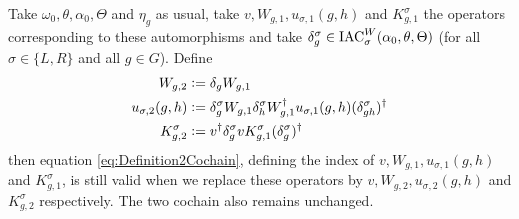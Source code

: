 \documentclass[12pt,a4paper,twoside]{article}
\numberwithin{equation}{section}
\begin{document}
\begin{lemma}\label{lem:TransformationUnderDeltaAppendix}
	Take $\omega_0,\theta,\alpha_0,\Theta$ and $\eta_g$ as usual, take $v,W_{g,1},u_{\sigma,1}(g,h)$ and $K_{g,1}^\sigma$ the operators corresponding to these automorphisms and take $\delta^\sigma_g\in\textrm{IAC}_\sigma^W(\alpha_0,\theta,\Theta)$ (for all $\sigma\in\{L,R\}$ and all $g\in G$). Define
	\begin{align}
		W_{g,2}&\vcentcolon=\delta_g W_{g,1}\\
		u_{\sigma,2}(g,h)&\vcentcolon= \delta_g^\sigma W_{g,1}\delta_h^\sigma W_{g,1}^\dagger u_{\sigma,1}(g,h)(\delta_{gh}^\sigma)^\dagger\\
		K^\sigma_{g,2}&\vcentcolon= v^\dagger \delta_g^\sigma v K_{g,1}^\sigma (\delta_g^\sigma)^\dagger
	\end{align}
	then equation \eqref{eq:Definition2Cochain}, defining the index of $v,W_{g,1},u_{\sigma,1}(g,h)$ and $K_{g,1}^\sigma$, is still valid when we replace these operators by $v,W_{g,2},u_{\sigma,2}(g,h)$ and $K_{g,2}^\sigma$ respectively. The two cochain also remains unchanged.
\end{lemma}
\end{document}
